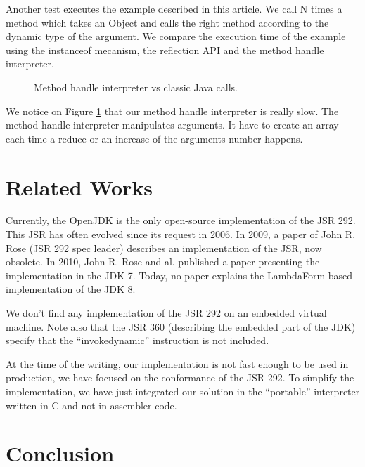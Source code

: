 \documentclass{sig-alternate}
\def \Jsr{JSR\xspace}
\def \JSR{\Jsr 292\xspace}
\begin{document}
  Another test executes the example described in this article.
  We call N times a method which takes an Object and calls the right method according to the dynamic type of the argument.
  We compare the execution time of the example using the instanceof mecanism, the reflection API and the method handle interpreter.

  \begin{figure}[!h]
    \resizebox{\linewidth}{!}{}
    \caption{Method handle interpreter vs classic Java calls.}\vspace{-1em}
    \label{Rmutable}
  \end{figure}

  We notice on Figure \ref{Rmutable} that our method handle interpreter is really slow.
  The method handle interpreter manipulates arguments.
  It have to create an array each time a reduce or an increase of the arguments number happens.

\section{Related Works}

  Currently, the OpenJDK is the only open-source implementation of the \JSR.
  This JSR has often evolved since its request in 2006\cite{jcp-jsr-292}.
  In 2009, a paper of John R. Rose (\JSR spec leader) describes an implementation of the \Jsr, now obsolete\cite{vmil-rose-indy-2009}.
  In 2010, John R. Rose and al. published a paper presenting the implementation in the JDK 7\cite{pppj-rose-indy-2010}.
  Today, no paper explains the LambdaForm-based implementation of the JDK 8.

  We don't find any implementation of the \JSR on an embedded virtual machine.
  Note also that the \Jsr 360 (describing the embedded part of the JDK) specify that the ``invokedynamic'' instruction is not included\cite{jcp-jsr-360}.



  At the time of the writing, our implementation is not fast enough to be used in production, we have focused on the conformance of the \JSR.
  To simplify the implementation, we have just integrated our solution in the ``portable'' interpreter written in C and not in assembler code.

\section{Conclusion}
\end{document}
